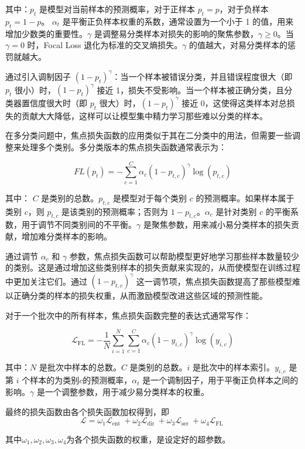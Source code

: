 其中：\( p_t \) 是模型对当前样本的预测概率，对于正样本 \( p_t = p \)，对于负样本 \( p_t = 1 - p \)。 \( \alpha_t \) 是平衡正负样本权重的系数，通常设置为一个小于 1 的值，用来增加少数类的重要性。\( \gamma \) 是调整易分类样本对损失的影响的聚焦参数，\( \gamma \geq 0 \)。当 \( \gamma = 0 \) 时，Focal Loss 退化为标准的交叉熵损失。\( \gamma \) 的值越大，对易分类样本的惩罚就越大。


通过引入调制因子 \( (1 - p_t)^\gamma \)：当一个样本被错误分类，并且错误程度很大（即 \( p_t \) 很小）时，\( (1 - p_t)^\gamma \) 接近 1，损失不受影响。当一个样本被正确分类，且分类器置信度很大时（即 \( p_t \) 很大）时，\( (1 - p_t)^\gamma \) 接近 0，这使得这类样本对总损失的贡献大大降低，这样可以让模型集中精力学习那些难以分类的样本。


在多分类问题中，焦点损失函数的应用类似于其在二分类中的用法，但需要一些调整来处理多个类别。多分类版本的焦点损失函数通常表示为：

\begin{equation}
    FL(p_t) = - \sum_{c=1}^C \alpha_c (1 - p_{t,c})^\gamma \log(p_{t,c})
\end{equation}


其中：
\( C \) 是类别的总数。\( p_{t,c} \) 是模型对于每个类别 \( c \) 的预测概率。如果样本属于类别 \( c \)，则 \( p_{t,c} \) 是该类别的预测概率；否则为 \( 1 - p_{t,c} \)。\( \alpha_c \) 是针对类别 \( c \) 的平衡系数，用于调节不同类别间的不平衡。\( \gamma \) 是聚焦参数，用来减小易分类样本的损失贡献，增加难分类样本的影响。


通过调节 \( \alpha_c \) 和 \( \gamma \) 参数，焦点损失函数可以帮助模型更好地学习那些样本数量较少的类别。这是通过增加这些类别样本的损失贡献来实现的，从而使模型在训练过程中更加关注它们。通过 \( (1 - p_{t,c})^\gamma \) 这一调节项，焦点损失函数提高了那些模型难以正确分类的样本的损失权重，从而激励模型改进这些区域的预测性能。


对于一个批次中的所有样本，焦点损失函数完整的表达式通常写作：

\begin{equation}
    \mathcal{L}_{\text {FL}} = -\frac{1}{N} \sum_{i=1}^{N}\sum_{c=1}^C \alpha_c (1 - y_{i,c})^\gamma \log(y_{i,c})
\end{equation}


其中：\(N\) 是批次中样本的总数。\( C \) 是类别的总数。\(i\) 是批次中的样本索引。\(y_{i,c}\) 是第 \(i\) 个样本的为类别\( c \)的预测概率，\(\alpha_t\) 是一个调制因子，用于平衡正负样本之间的影响。\(\gamma\) 是一个调整参数，用于减少易分类样本的权重。



最终的损失函数由各个损失函数加权得到，即
\begin{equation}
    \mathcal{L}=\omega_1\mathcal{L}_{\text {ent }}+\omega_2\mathcal{L}_{\text {dir }}+\omega_3\mathcal{L}_{\text {ser }}
    +\omega_4\mathcal{L}_{\text {FL }}
\end{equation}

其中$\omega_1,\omega_2,\omega_3,\omega_4$为各个损失函数的权重，是设定好的超参数。
